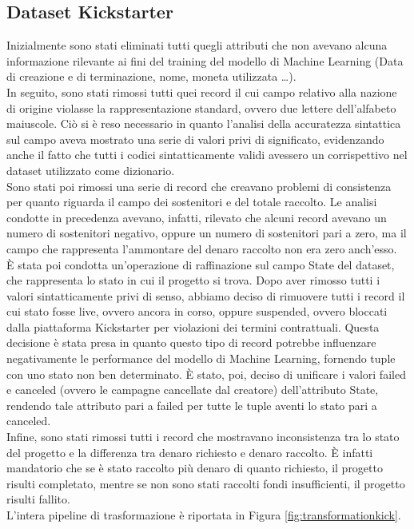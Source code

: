 \subsection{Dataset Kickstarter}
Inizialmente sono stati eliminati tutti quegli attributi che non avevano alcuna informazione rilevante ai fini del training del modello di Machine Learning (Data di creazione e di terminazione, nome, moneta utilizzata \dots).\\
In seguito, sono stati rimossi tutti quei record il cui campo relativo alla nazione di origine violasse la rappresentazione standard, ovvero due lettere dell'alfabeto maiuscole. Ciò si è reso necessario in quanto l'analisi della accuratezza sintattica sul campo aveva mostrato una serie di valori privi di significato, evidenzando anche il fatto che tutti i codici sintatticamente validi avessero un corrispettivo nel dataset utilizzato come dizionario.\\
Sono stati poi rimossi una serie di record che creavano problemi di consistenza per quanto riguarda il campo dei sostenitori e del totale raccolto. Le analisi condotte in precedenza avevano, infatti, rilevato che alcuni record avevano un numero di sostenitori negativo, oppure un numero di sostenitori pari a zero, ma il campo che rappresenta l'ammontare del denaro raccolto non era zero anch'esso.\\
È stata poi condotta un'operazione di raffinazione sul campo State del dataset, che rappresenta lo stato in cui il progetto si trova. Dopo aver rimosso tutti i valori sintatticamente privi di senso, abbiamo deciso di rimuovere tutti i record il cui stato fosse live, ovvero ancora in corso, oppure suspended, ovvero bloccati dalla piattaforma Kickstarter per violazioni dei termini contrattuali. Questa decisione è stata presa in quanto questo tipo di record potrebbe influenzare negativamente le performance del modello di Machine Learning, fornendo tuple con uno stato non ben determinato.
È stato, poi, deciso di unificare i valori failed e canceled (ovvero le campagne cancellate dal creatore) dell'attributo State, rendendo tale attributo pari a failed per tutte le tuple aventi lo stato pari a canceled.\\
Infine, sono stati rimossi tutti i record che mostravano inconsistenza tra lo stato del progetto e la differenza tra denaro richiesto e denaro raccolto. È infatti mandatorio che se è stato raccolto più denaro di quanto richiesto, il progetto risulti completato, mentre se non sono stati raccolti fondi insufficienti, il progetto risulti fallito.\\
L'intera pipeline di trasformazione è riportata in Figura \ref{fig:transformationkick}.



